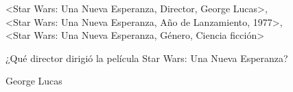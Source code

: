 \begin{tcolorbox}[colback=white,colframe=black!50!white,title=Input]
<Star Wars: Una Nueva Esperanza, Director, George Lucas>, \\
<Star Wars: Una Nueva Esperanza, Año de Lanzamiento, 1977>, \\
<Star Wars: Una Nueva Esperanza, Género, Ciencia ficción>
\end{tcolorbox}
\begin{tcolorbox}[colback=white,colframe=black!50!white,title=Pregunta]
¿Qué director dirigió la película Star Wars: Una Nueva Esperanza?
\end{tcolorbox}
\begin{tcolorbox}[colback=white,colframe=black!50!white,title=Respuesta esperada]
George Lucas
\end{tcolorbox}


